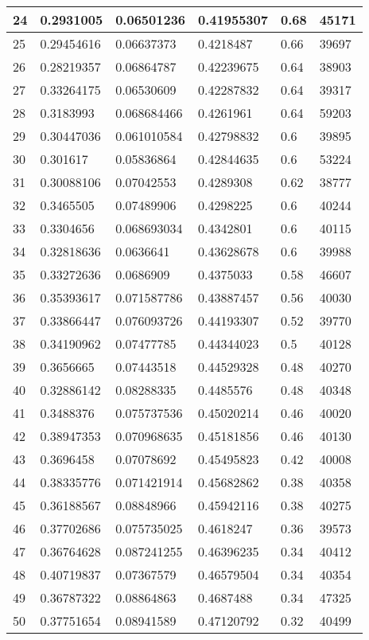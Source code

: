 \begin{longtable}{|l|l|l|l|l|l|}
24 & 0.2931005 & 0.06501236 & 0.41955307 & 0.68 & 45171 \\ \hline 
25 & 0.29454616 & 0.06637373 & 0.4218487 & 0.66 & 39697 \\ \hline 
26 & 0.28219357 & 0.06864787 & 0.42239675 & 0.64 & 38903 \\ \hline 
27 & 0.33264175 & 0.06530609 & 0.42287832 & 0.64 & 39317 \\ \hline 
28 & 0.3183993 & 0.068684466 & 0.4261961 & 0.64 & 59203 \\ \hline 
29 & 0.30447036 & 0.061010584 & 0.42798832 & 0.6 & 39895 \\ \hline 
30 & 0.301617 & 0.05836864 & 0.42844635 & 0.6 & 53224 \\ \hline 
31 & 0.30088106 & 0.07042553 & 0.4289308 & 0.62 & 38777 \\ \hline 
32 & 0.3465505 & 0.07489906 & 0.4298225 & 0.6 & 40244 \\ \hline 
33 & 0.3304656 & 0.068693034 & 0.4342801 & 0.6 & 40115 \\ \hline 
34 & 0.32818636 & 0.0636641 & 0.43628678 & 0.6 & 39988 \\ \hline 
35 & 0.33272636 & 0.0686909 & 0.4375033 & 0.58 & 46607 \\ \hline 
36 & 0.35393617 & 0.071587786 & 0.43887457 & 0.56 & 40030 \\ \hline 
37 & 0.33866447 & 0.076093726 & 0.44193307 & 0.52 & 39770 \\ \hline 
38 & 0.34190962 & 0.07477785 & 0.44344023 & 0.5 & 40128 \\ \hline 
39 & 0.3656665 & 0.07443518 & 0.44529328 & 0.48 & 40270 \\ \hline 
40 & 0.32886142 & 0.08288335 & 0.4485576 & 0.48 & 40348 \\ \hline 
41 & 0.3488376 & 0.075737536 & 0.45020214 & 0.46 & 40020 \\ \hline 
42 & 0.38947353 & 0.070968635 & 0.45181856 & 0.46 & 40130 \\ \hline 
43 & 0.3696458 & 0.07078692 & 0.45495823 & 0.42 & 40008 \\ \hline 
44 & 0.38335776 & 0.071421914 & 0.45682862 & 0.38 & 40358 \\ \hline 
45 & 0.36188567 & 0.08848966 & 0.45942116 & 0.38 & 40275 \\ \hline 
46 & 0.37702686 & 0.075735025 & 0.4618247 & 0.36 & 39573 \\ \hline 
47 & 0.36764628 & 0.087241255 & 0.46396235 & 0.34 & 40412 \\ \hline 
48 & 0.40719837 & 0.07367579 & 0.46579504 & 0.34 & 40354 \\ \hline 
49 & 0.36787322 & 0.08864863 & 0.4687488 & 0.34 & 47325 \\ \hline 
50 & 0.37751654 & 0.08941589 & 0.47120792 & 0.32 & 40499 \\ \hline 
\end{longtable}